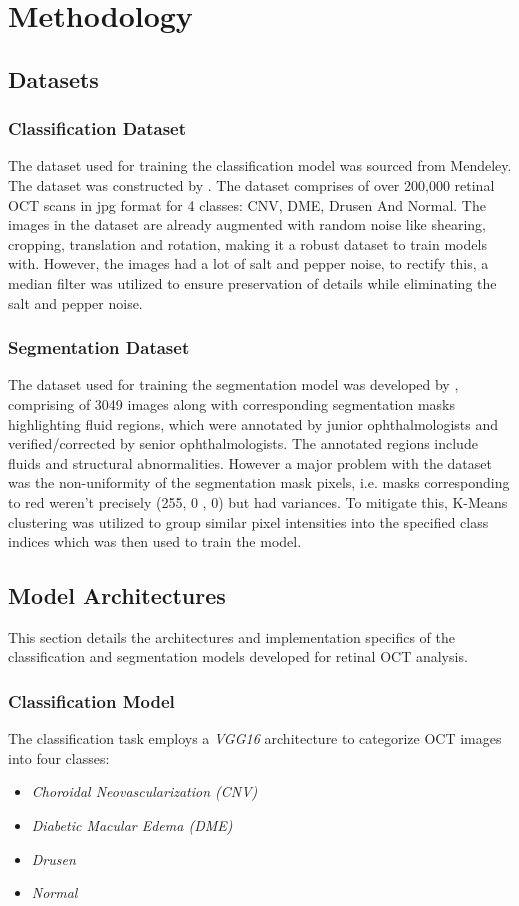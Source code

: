 \documentclass[conference]{IEEEtran}
\begin{document}
\section{Methodology}
\subsection{Datasets}
\subsubsection{Classification Dataset}
The dataset used for training the classification model was sourced from Mendeley. The dataset was constructed by \cite{Kermany2017}. The dataset comprises of over 200,000 retinal OCT scans in jpg format for 4 classes: CNV, DME, Drusen And Normal. The images in the dataset are already augmented with random noise like shearing, cropping, translation and rotation, making it a robust dataset to train models with. However, the images had a lot of salt and pepper noise, to rectify this, a median filter was utilized to ensure preservation of details while eliminating the salt and pepper noise.

\subsubsection{Segmentation Dataset}
The dataset used for training the segmentation model was developed by \cite{Hu2024}, comprising of 3049 images along with corresponding segmentation masks highlighting fluid regions, which were annotated by junior ophthalmologists and verified/corrected by senior ophthalmologists. The annotated regions include fluids and structural abnormalities. However a major problem with the dataset was the non-uniformity of the segmentation mask pixels, i.e. masks corresponding to red weren't precisely (255, 0 , 0) but had variances. To mitigate this, K-Means clustering was utilized to group similar pixel intensities into the specified class indices which was then used to train the model.

\subsection{Model Architectures}
This section details the architectures and implementation specifics of the classification and segmentation models developed for retinal OCT analysis.

\subsubsection{Classification Model}
The classification task employs a \textit{VGG16} \cite{simonyan2015deepconvolutionalnetworkslargescale} architecture to categorize OCT images into four classes:
\begin{itemize}
    \item \textit{Choroidal Neovascularization (CNV)}
    \item \textit{Diabetic Macular Edema (DME)}
    \item \textit{Drusen}
    \item \textit{Normal}
\end{itemize}
\end{document}
